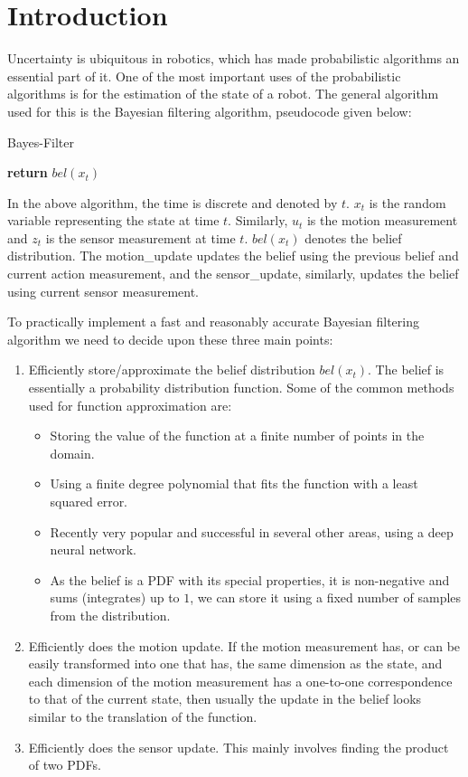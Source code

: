 \section{Introduction}
Uncertainty is ubiquitous in robotics, which has made probabilistic algorithms an essential part of it. One of the most important uses of the probabilistic algorithms is for the estimation of the state of a robot. The general algorithm used for this is the Bayesian filtering algorithm, pseudocode given below:

\begin{algorithm}
\caption{Bayes-Filter}\label{bayes_algo}
\begin{algorithmic}[1]
\State \textbf{return} $bel(x_t)$ 
\end{algorithmic}
\end{algorithm}

In the above algorithm, the time is discrete and denoted by $t$. $x_t$ is the random variable representing the state at time $t$. Similarly, $u_t$ is the motion measurement and $z_t$ is the sensor measurement at time $t$. $bel(x_t)$ denotes the belief distribution. The motion\_update updates the belief using the previous belief and current action measurement, and the sensor\_update, similarly, updates the belief using current sensor measurement.

To practically implement a fast and reasonably accurate Bayesian filtering algorithm we need to decide upon these three main points:
\begin{enumerate}
\item Efficiently store/approximate the belief distribution $bel(x_t)$. The belief is essentially a probability distribution function. Some of the common methods used for function approximation are:
\begin{itemize}
    \item Storing the value of the function at a finite number of points in the domain.
    \item Using a finite degree polynomial that fits the function with a least squared error.
    \item Recently very popular and successful in several other areas, using a deep neural network.
    \item As the belief is a PDF with its special properties, it is non-negative and sums (integrates) up to $1$, we can store it using a fixed number of samples from the distribution.
\end{itemize}
\item Efficiently does the motion update. If the motion measurement has, or can be easily transformed into one that has, the same dimension as the state, and each dimension of the motion measurement has a one-to-one correspondence to that of the current state, then usually the update in the belief looks similar to the translation of the function.
\item Efficiently does the sensor update. This mainly involves finding the product of two PDFs.
\end{enumerate}

